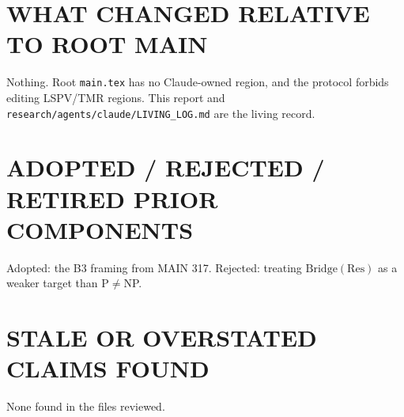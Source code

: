\documentclass[11pt]{article}
\begin{document}
\section*{WHAT CHANGED RELATIVE TO ROOT MAIN}
Nothing. Root \texttt{main.tex} has no Claude-owned region, and the protocol forbids editing LSPV/TMR regions. This report and \texttt{research/agents/claude/LIVING\_LOG.md} are the living record.
\section*{ADOPTED / REJECTED / RETIRED PRIOR COMPONENTS}
Adopted: the B3 framing from MAIN 317. Rejected: treating $\mathrm{Bridge}(\mathrm{Res})$ as a weaker target than P$\ne$NP.
\section*{STALE OR OVERSTATED CLAIMS FOUND}
None found in the files reviewed.
\end{document}

